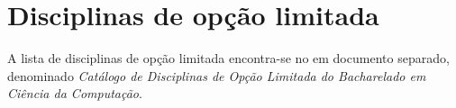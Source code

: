 \section{Disciplinas de opção limitada}
\label{sec:disciplinas_ol}

A lista de disciplinas de opção limitada encontra-se no em documento separado,
denominado \emph{Catálogo de Disciplinas de Opção Limitada do Bacharelado em
Ciência da Computação}.
